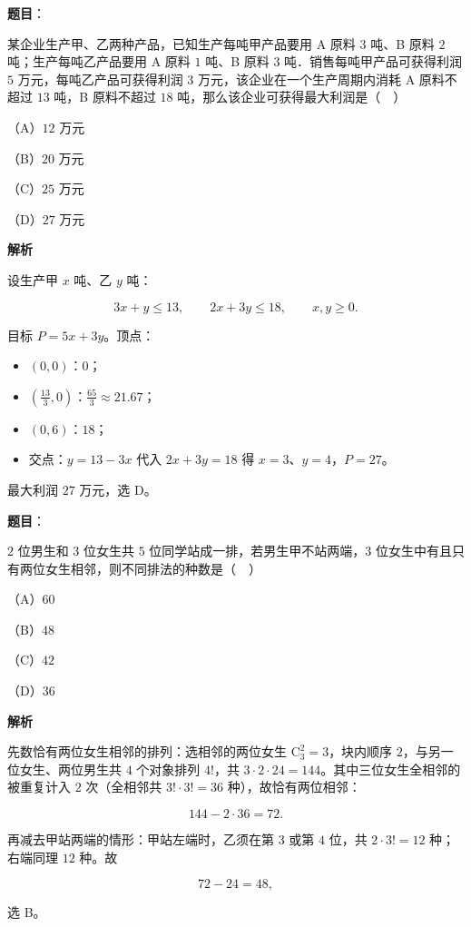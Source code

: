 \begin{answer}

\textbf{题目}：

某企业生产甲、乙两种产品，已知生产每吨甲产品要用 A 原料 $3$ 吨、B 原料 $2$ 吨；生产每吨乙产品要用 A 原料 $1$ 吨、B 原料 $3$ 吨．销售每吨甲产品可获得利润 $5$ 万元，每吨乙产品可获得利润 $3$ 万元，该企业在一个生产周期内消耗 A 原料不超过 $13$ 吨，B 原料不超过 $18$ 吨，那么该企业可获得最大利润是（　）

（A）$12$ 万元

（B）$20$ 万元

（C）$25$ 万元

（D）$27$ 万元

\textbf{解析}

设生产甲 $x$ 吨、乙 $y$ 吨：

\nopagebreak[4]
\[3x+y\leqslant13,\qquad 2x+3y\leqslant18,\qquad x,y\geqslant0 .\]

目标 $P=5x+3y$。顶点：

\begin{itemize}
\item $(0,0)$：$0$；
\item $\left(\frac{13}{3},0\right)$：$\frac{65}{3}\approx21.67$；
\item $(0,6)$：$18$；
\item 交点：$y=13-3x$ 代入 $2x+3y=18$ 得 $x=3$、$y=4$，$P=27$。
\end{itemize}

最大利润 $27$ 万元，选 D。


\end{answer}
\begin{answer}

\textbf{题目}：

$2$ 位男生和 $3$ 位女生共 $5$ 位同学站成一排，若男生甲不站两端，$3$ 位女生中有且只有两位女生相邻，则不同排法的种数是（　）

（A）$60$

（B）$48$

（C）$42$

（D）$36$

\textbf{解析}

先数恰有两位女生相邻的排列：选相邻的两位女生 $\mathrm C_3^2=3$，块内顺序 $2$，与另一位女生、两位男生共 $4$ 个对象排列 $4!$，共 $3\cdot2\cdot24=144$。其中三位女生全相邻的被重复计入 $2$ 次（全相邻共 $3!\cdot3!=36$ 种），故恰有两位相邻：

\nopagebreak[4]
\[144-2\cdot36=72 .\]

再减去甲站两端的情形：甲站左端时，乙须在第 $3$ 或第 $4$ 位，共 $2\cdot3!=12$ 种；右端同理 $12$ 种。故

\nopagebreak[4]
\[72-24=48,\]

选 B。


\end{answer}
